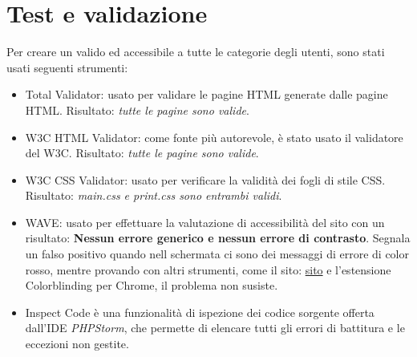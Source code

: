\documentclass[1_relazione.tex]{subfiles}
\begin{document}
    \section{Test e validazione}\label{sec:test-e-validazione}
    Per creare un valido ed accessibile a tutte le categorie degli utenti, sono stati usati seguenti strumenti:
    \begin{itemize}
        \item{Total Validator}: usato per validare le pagine HTML generate dalle pagine HTML. Risultato: \textit{tutte le pagine sono valide}.
        \item{W3C HTML Validator}: come fonte pi\`{u} autorevole, \`{e} stato usato il validatore del W3C. Risultato: \textit{tutte le pagine sono valide}.
        \item{W3C CSS Validator}: usato per verificare la validit\`{a} dei fogli di stile CSS. Risultato: \textit{main.css e print.css sono entrambi validi}.
        \item{WAVE}: usato per effettuare la valutazione di accessibilit\`{a} del sito con un risultato: \textbf{Nessun errore generico e nessun errore di contrasto}. Segnala un falso positivo quando nell schermata ci sono dei messaggi di errore di color rosso, mentre provando con altri strumenti, come il sito: \href{https://www.color-blindness.com/coblis-color-blindness-simulator/}{sito} e l'estensione Colorblinding per Chrome, il problema non susiste. 
        \item{Inspect Code} \`{e} una funzionalit\`{a} di ispezione dei codice sorgente offerta dall'IDE \textit{PHPStorm}, che permette di elencare tutti gli errori di battitura e le eccezioni non gestite.        
    \end{itemize}
\end{document}

